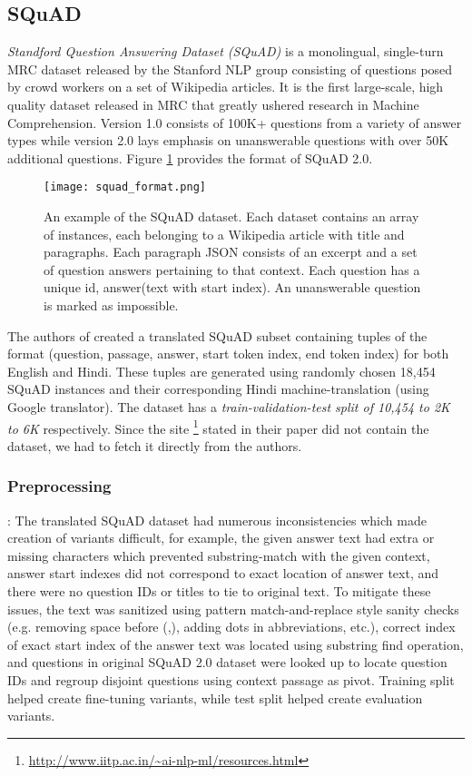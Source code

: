 \documentclass[acmsmall]{acmart}
\begin{document}
\subsection{SQuAD}
\label{squad_sec}
\textit{Standford Question Answering Dataset (SQuAD)} is a monolingual, single-turn MRC dataset released by the Stanford NLP group consisting of questions posed by crowd workers on a set of Wikipedia articles. It is the first large-scale, high quality dataset released  in  MRC  that  greatly  ushered  research in Machine Comprehension.  Version 1.0 \cite{squad} consists of 100K+ questions from a variety of answer types while version 2.0 \cite{squad2.0} lays emphasis on unanswerable questions with over 50K additional questions. Figure \ref{fig:squad} provides the format of SQuAD 2.0.

\begin{figure}[h]
\texttt{[image: squad\_format.png]}
 \caption{An example of the SQuAD dataset. Each dataset contains an array of instances, each belonging to a Wikipedia article with title and paragraphs. Each paragraph JSON consists of an excerpt and a set of question answers pertaining to that context. Each question has a unique id, answer(text with start index). An unanswerable question  is marked as impossible. }
 \label{fig:squad}
\end{figure}

\par The authors of \cite{latestMQA} created a translated SQuAD subset 
containing tuples of the format (question, passage,
answer, start token index, end token index) for both English and Hindi. These tuples are generated using randomly chosen 18,454 SQuAD instances and their corresponding Hindi machine-translation (using Google translator). The dataset has a \textit{train-validation-test split of  10,454 to 2K to 6K} respectively.  Since the site \footnote{\url{http://www.iitp.ac.in/~ai-nlp-ml/resources.html}} stated in their paper did not contain the dataset, we had to fetch it directly  from the authors. 
\subsubsection{Preprocessing}: The translated SQuAD dataset had numerous inconsistencies which made creation of variants difficult, for example, the given answer text had extra or missing characters which prevented substring-match with the given context, answer start indexes did not correspond to exact location of answer text, and there were no question IDs or titles to tie to original text. To mitigate these issues, the text was sanitized using pattern match-and-replace style sanity checks (e.g. removing space before (,), adding dots in abbreviations, etc.), correct index of exact start index of the answer text was located using substring find operation, and questions in original SQuAD 2.0 dataset were looked up to locate question IDs and regroup disjoint questions using context passage as pivot. Training split helped create fine-tuning variants, while test split helped create evaluation variants. 
\end{document}
